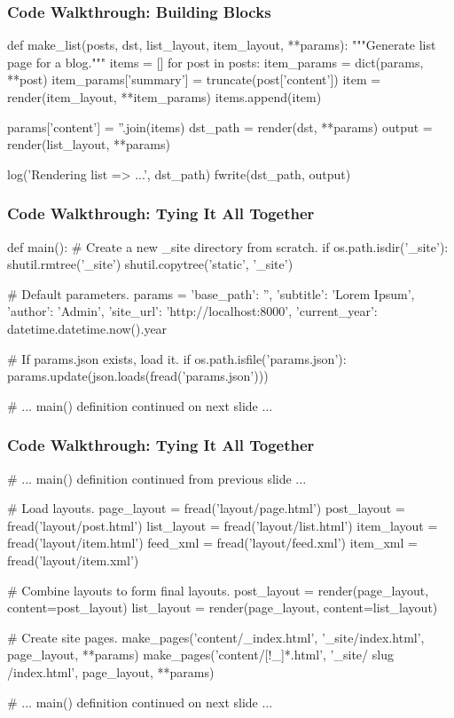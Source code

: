 \documentclass{beamer}
\begin{document}
\begin{frame}[fragile]
\frametitle{Code Walkthrough: Building Blocks}
\begin{pythoncode}
def make_list(posts, dst, list_layout, item_layout, **params):
    """Generate list page for a blog."""
    items = []
    for post in posts:
        item_params = dict(params, **post)
        item_params['summary'] = truncate(post['content'])
        item = render(item_layout, **item_params)
        items.append(item)

    params['content'] = ''.join(items)
    dst_path = render(dst, **params)
    output = render(list_layout, **params)

    log('Rendering list => {} ...', dst_path)
    fwrite(dst_path, output)
\end{pythoncode}
\end{frame}


\begin{frame}[fragile]
\frametitle{Code Walkthrough: Tying It All Together}
\begin{pythoncode}
def main():
    # Create a new _site directory from scratch.
    if os.path.isdir('_site'):
        shutil.rmtree('_site')
    shutil.copytree('static', '_site')

    # Default parameters.
    params = {
        'base_path': '',
        'subtitle': 'Lorem Ipsum',
        'author': 'Admin',
        'site_url': 'http://localhost:8000',
        'current_year': datetime.datetime.now().year
    }

    # If params.json exists, load it.
    if os.path.isfile('params.json'):
        params.update(json.loads(fread('params.json')))

    # ... main() definition continued on next slide ...
\end{pythoncode}
\end{frame}


\begin{frame}[fragile]
\frametitle{Code Walkthrough: Tying It All Together}
\begin{pythoncode}
    # ... main() definition continued from previous slide ...

    # Load layouts.
    page_layout = fread('layout/page.html')
    post_layout = fread('layout/post.html')
    list_layout = fread('layout/list.html')
    item_layout = fread('layout/item.html')
    feed_xml = fread('layout/feed.xml')
    item_xml = fread('layout/item.xml')

    # Combine layouts to form final layouts.
    post_layout = render(page_layout, content=post_layout)
    list_layout = render(page_layout, content=list_layout)

    # Create site pages.
    make_pages('content/_index.html', '_site/index.html',
               page_layout, **params)
    make_pages('content/[!_]*.html', '_site/{{ slug }}/index.html',
               page_layout, **params)

    # ... main() definition continued on next slide ...
\end{pythoncode}
\end{frame}
\end{document}
